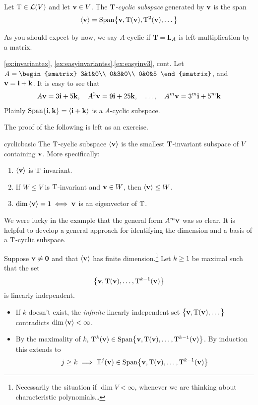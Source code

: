 \begin{defn}{}{}
	Let $\mathrm{T}\in\mathcal{L}(V)$ and let ${\mathbf{v}}\in V$. The \emph{$\mathrm{T}$-cyclic subspace} generated by ${\mathbf{v}}$ is the span
	\[
		\left\langle {\mathbf{v}}\right\rangle=\operatorname{Span}\bigl\{{\mathbf{v}},\mathrm{T}({\mathbf{v}}),\mathrm{T}^2({\mathbf{v}}),\ldots\big\}
	\]\vspace{-5pt}
\end{defn}

As you should expect by now, we say $A$-cyclic if $\mathrm{T}=\mathrm{L}_A$ is left-multiplication by a matrix.


\begin{example*}{\ref{ex:invariantex}, \ref*{ex:easyinvariantss}.\ref{ex:easyinv3}, cont.}{}
	Let $A=
	\begin{smatrix}
		3&1&0\\
		0&3&0\\
		0&0&5
	\end{smatrix}$, and ${\mathbf{v}}={\mathbf{i}}+{\mathbf{k}}$. It is easy to see that
	\[
		A{\mathbf{v}}=3{\mathbf{i}}+5{\mathbf{k}},\quad A^2{\mathbf{v}}=9{\mathbf{i}}+25{\mathbf{k}},
		\quad\ldots,\quad 
		A^m{\mathbf{v}}=3^m{\mathbf{i}}+5^m{\mathbf{k}}
	\]
	Plainly $\operatorname{Span}\{{\mathbf{i}},{\mathbf{k}}\}=\left\langle {\mathbf{i}}+{\mathbf{k}}\right\rangle$ is a $A$-cyclic subspace.
\end{example*}


The proof of the following is left as an exercise.

\begin{lemm}{}{cyclicbasic}
	The $\mathrm{T}$-cyclic subspace $\left\langle {\mathbf{v}}\right\rangle$ is the smallest $\mathrm{T}$-invariant subspace of $V$ containing ${\mathbf{v}}$. More specifically:
	\begin{enumerate}
	  \item $\left\langle {\mathbf{v}}\right\rangle$ is $\mathrm{T}$-invariant.
	  \item If $W\le V$ is $\mathrm{T}$-invariant and ${\mathbf{v}}\in W$, then $\left\langle {\mathbf{v}}\right\rangle\le W$.
	  \item $\dim\left\langle {\mathbf{v}}\right\rangle=1\iff{\mathbf{v}}$ is an eigenvector of $\mathrm{T}$.
	\end{enumerate}
\end{lemm}

We were lucky in the example that the general form $A^m{\mathbf{v}}$ was so clear. It is helpful to develop a general approach for identifying the dimension and a basis of a $\mathrm{T}$-cyclic subspace.\medbreak

Suppose ${\mathbf{v}}\neq\mathbf{0}$ and that $\left\langle {\mathbf{v}}\right\rangle$ has finite dimension.\footnote{%
	Necessarily the situation if $\dim V<\infty$, whenever we are thinking about characteristic polynomials\ldots%
}
Let $k\ge 1$ be maximal such that the set
\[
	\big\{{\mathbf{v}},\mathrm{T}({\mathbf{v}}),\ldots,\mathrm{T}^{k-1}({\mathbf{v}})\big\}
\]
is linearly independent.
\begin{itemize}
  \item If $k$ doesn't exist, the \emph{infinite} linearly independent set $\big\{{\mathbf{v}},\mathrm{T}({\mathbf{v}}),\ldots\big\}$ contradicts $\dim\left\langle {\mathbf{v}}\right\rangle<\infty$.
  \item By the maximality of $k$, $\mathrm{T}^k({\mathbf{v}})\in\operatorname{Span}\bigl\{{\mathbf{v}},\mathrm{T}({\mathbf{v}}),\ldots,\mathrm{T}^{k-1}({\mathbf{v}})\big\}$. By induction this extends to
  \[
  	j\ge k\implies \mathrm{T}^j({\mathbf{v}})\in\operatorname{Span}\bigl\{{\mathbf{v}},\mathrm{T}({\mathbf{v}}),\ldots,\mathrm{T}^{k-1}({\mathbf{v}})\big\}
  \]
\end{itemize}


